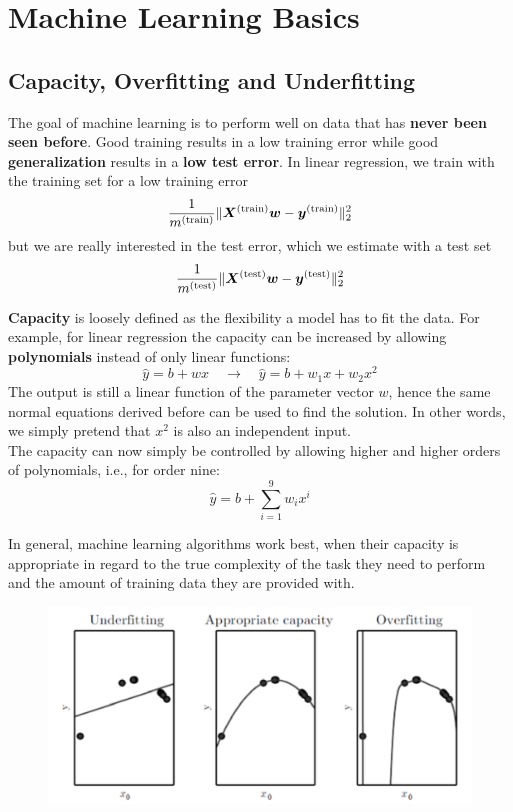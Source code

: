\section{Machine Learning Basics}
\begin{multicols}{2}
	\subsection{Capacity, Overfitting and Underfitting}
	The goal of machine learning is to perform well on data that has \textbf{never been seen before}.
	Good training results in a low training error while good \textbf{generalization} results in a \textbf{low test error}.
	In linear regression, we train with the training set for a low training error
	\[ \frac{1}{m^{\text{(train)}}} \lVert \bol{X}^{\text{(train)}}\bol{w}-\bol{y}^{\text{(train)}} \rVert_2^2 \]
	but we are really interested in the test error, which we estimate with a test set
	\[ \frac{1}{m^{\text{(test)}}} \lVert \bol{X}^{\text{(test)}}\bol{w}-\bol{y}^{\text{(test)}} \rVert_2^2 \]
	
	\textbf{Capacity} is loosely defined as the flexibility a model has to fit the data. 
	For example, for linear regression the capacity can be increased by allowing \textbf{polynomials} instead of only linear functions:
	\[ \hat{y} = b + wx \quad\rightarrow\quad \hat{y} = b + w_1x + w_2x^2 \]
	The output is still a linear function of the parameter vector $w$, hence the same normal equations derived before can be used to find the solution.
	In other words, we simply pretend that $x^2$ is also an independent input.\\
	The capacity can now simply be controlled by allowing higher and higher orders of polynomials, i.e., for order nine:
	\[ \hat{y} = b + \sum_{i=1}^{9} w_ix^i \]
	
	In general, machine learning algorithms work best, when their capacity is appropriate in regard to the true complexity of the task they need to perform and the amount of training data they are provided with.
	\begin{figure}[H]
		\centering
		\includegraphics[width=0.85\linewidth]{images/capacity.PNG}
	\end{figure}


\end{multicols}
